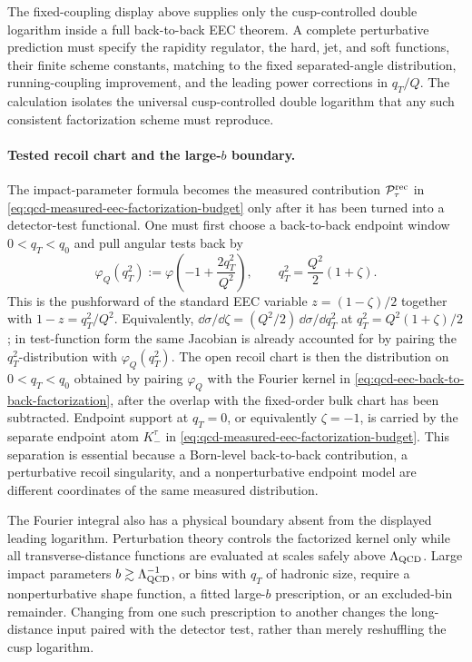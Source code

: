 \begin{remark}
\label{rem:qcd-eec-sudakov-scope}
The fixed-coupling display above supplies only the cusp-controlled double
logarithm inside a full back-to-back EEC theorem.  A complete perturbative
prediction must specify the rapidity regulator, the hard, jet, and soft
functions, their finite scheme constants, matching to the fixed
separated-angle distribution, running-coupling improvement, and the leading
power corrections in \(q_T/Q\).  The calculation isolates the universal
cusp-controlled double logarithm that any such consistent factorization scheme
must reproduce.
\end{remark}

\paragraph{Tested recoil chart and the large-\(b\) boundary.}
The impact-parameter formula becomes the measured contribution
\(\mathcal P_\tau^{\rm rec}\) in
\eqref{eq:qcd-measured-eec-factorization-budget} only after it has been
turned into a detector-test functional.  One must first choose a
back-to-back endpoint window
\(0<q_T<q_0\) and pull angular tests back by
\begin{equation}
  \varphi_Q(q_T^2)
  :=
  \varphi\!\left(-1+\frac{2q_T^2}{Q^2}\right),
  \qquad
  q_T^2=\frac{Q^2}{2}(1+\zeta).
  \label{eq:qcd-eec-recoil-test-pullback}
\end{equation}
This is the pushforward of the standard EEC variable
\(z=(1-\zeta)/2\) together with \(1-z=q_T^2/Q^2\).  Equivalently,
\(\dd\sigma/\dd\zeta=(Q^2/2)\,\dd\sigma/\dd q_T^2\) at
\(q_T^2=Q^2(1+\zeta)/2\); in test-function form the same Jacobian is already
accounted for by pairing the \(q_T^2\)-distribution with
\(\varphi_Q(q_T^2)\).  The open recoil chart is then the distribution on
\(0<q_T<q_0\) obtained by pairing \(\varphi_Q\) with the Fourier kernel in
\eqref{eq:qcd-eec-back-to-back-factorization}, after the overlap with the
fixed-order bulk chart has been subtracted.  Endpoint support at \(q_T=0\), or
equivalently \(\zeta=-1\), is carried by the separate endpoint atom
\(K_-^\tau\) in
\eqref{eq:qcd-measured-eec-factorization-budget}.  This separation is
essential because a Born-level back-to-back contribution, a perturbative
recoil singularity, and a nonperturbative endpoint model are different
coordinates of the same measured distribution.

The Fourier integral also has a physical boundary absent from the displayed
leading logarithm.  Perturbation theory controls the factorized kernel only
while all transverse-distance functions are evaluated at scales safely above
\(\Lambda_{\rm QCD}\).  Large impact parameters \(b\gtrsim
\Lambda_{\rm QCD}^{-1}\), or bins with \(q_T\) of hadronic size, require a
nonperturbative shape function, a fitted large-\(b\) prescription, or an
excluded-bin remainder.  Changing from one such prescription to another
changes the long-distance input paired with the detector test, rather than
merely reshuffling the cusp logarithm.

